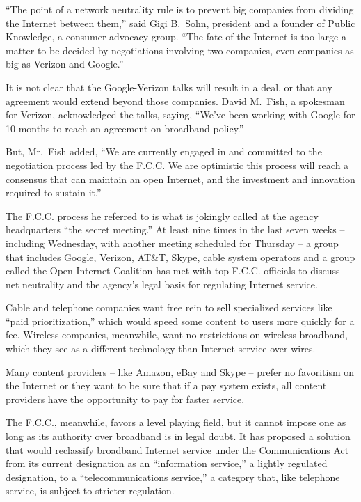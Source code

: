 ﻿\documentclass[12pt]{article}
\begin{document}
``The point of a network neutrality rule is to prevent big companies from dividing the Internet
between them,'' said Gigi B.~Sohn, president and a founder of Public Knowledge, a consumer advocacy
group. ``The fate of the Internet is too large a matter to be decided by negotiations involving two
companies, even companies as big as Verizon and Google.''

It is not clear that the Google-Verizon talks will result in a deal, or that any agreement would
extend beyond those companies. David M.~Fish, a spokesman for Verizon, acknowledged the talks,
saying, ``We've been working with Google for 10 months to reach an agreement on broadband policy.''

But, Mr.~Fish added, ``We are currently engaged in and committed to the negotiation process led by
the F.C.C. We are optimistic this process will reach a consensus that can maintain an open Internet,
and the investment and innovation required to sustain it.''

The F.C.C. process he referred to is what is jokingly called at the agency headquarters ``the secret
meeting.'' At least nine times in the last seven weeks -- including Wednesday, with another meeting
scheduled for Thursday -- a group that includes Google, Verizon, AT\&T, Skype, cable system
operators and a group called the Open Internet Coalition has met with top F.C.C. officials to
discuss net neutrality and the agency's legal basis for regulating Internet service.

Cable and telephone companies want free rein to sell specialized services like ``paid
prioritization,'' which would speed some content to users more quickly for a fee. Wireless
companies, meanwhile, want no restrictions on wireless broadband, which they see as a different
technology than Internet service over wires.

Many content providers -- like Amazon, eBay and Skype -- prefer no favoritism on the Internet or
they want to be sure that if a pay system exists, all content providers have the opportunity to pay
for faster service.

The F.C.C., meanwhile, favors a level playing field, but it cannot impose one as long as its
authority over broadband is in legal doubt. It has proposed a solution that would reclassify
broadband Internet service under the Communications Act from its current designation as an
``information service,'' a lightly regulated designation, to a ``telecommunications service,'' a
category that, like telephone service, is subject to stricter regulation.
\end{document}
